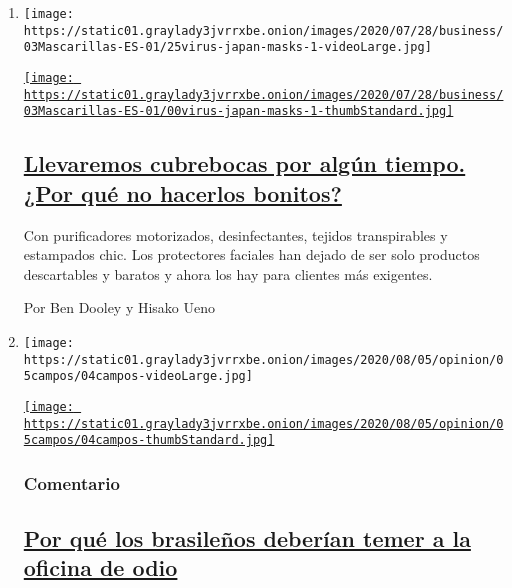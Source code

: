 \begin{enumerate}
\def\labelenumi{\arabic{enumi}.}
\item
  \texttt{[image: https://static01.graylady3jvrrxbe.onion/images/2020/07/28/business/03Mascarillas-ES-01/25virus-japan-masks-1-videoLarge.jpg]}

  \href{/es/2020/08/04/espanol/negocios/japon-cubrebocas.html}{\texttt{[image: https://static01.graylady3jvrrxbe.onion/images/2020/07/28/business/03Mascarillas-ES-01/00virus-japan-masks-1-thumbStandard.jpg]}}

  \hypertarget{llevaremos-cubrebocas-por-alguxfan-tiempo-por-quuxe9-no-hacerlos-bonitos}{%
  \subsection{\texorpdfstring{\href{/es/2020/08/04/espanol/negocios/japon-cubrebocas.html}{Llevaremos
  cubrebocas por algún tiempo. ¿Por qué no hacerlos
  bonitos?}}{Llevaremos cubrebocas por algún tiempo. ¿Por qué no hacerlos bonitos?}}\label{llevaremos-cubrebocas-por-alguxfan-tiempo-por-quuxe9-no-hacerlos-bonitos}}

  Con purificadores motorizados, desinfectantes, tejidos transpirables y
  estampados chic. Los protectores faciales han dejado de ser solo
  productos descartables y baratos y ahora los hay para clientes más
  exigentes.

  Por Ben Dooley y Hisako Ueno
\item
  \texttt{[image: https://static01.graylady3jvrrxbe.onion/images/2020/08/05/opinion/05campos/04campos-videoLarge.jpg]}

  \href{/es/2020/08/04/espanol/opinion/bolsonaro-oficina-odio-brasil.html}{\texttt{[image: https://static01.graylady3jvrrxbe.onion/images/2020/08/05/opinion/05campos/04campos-thumbStandard.jpg]}}

  \hypertarget{comentario}{%
  \subsubsection{Comentario}\label{comentario}}

  \hypertarget{por-quuxe9-los-brasileuxf1os-deberuxedan-temer-a-la-oficina-de-odio}{%
  \subsection{\texorpdfstring{\href{/es/2020/08/04/espanol/opinion/bolsonaro-oficina-odio-brasil.html}{Por
  qué los brasileños deberían temer a la oficina de
  odio}}{Por qué los brasileños deberían temer a la oficina de odio}}\label{por-quuxe9-los-brasileuxf1os-deberuxedan-temer-a-la-oficina-de-odio}}


\end{enumerate}
